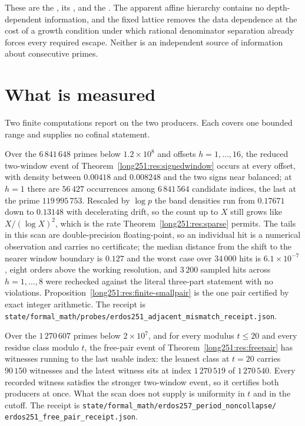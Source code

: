 \documentclass[11pt]{article}
\begin{document}
\noindent These are the
, its
, and the
.  The apparent affine hierarchy contains no depth-dependent
information, and the fixed lattice removes the data dependence at the cost of a
growth condition under which rational denominator separation already forces
every required escape.  Neither is an independent source of information about
consecutive primes.

\section{What is measured}\label{long251:sec:measurements}

Two finite computations report on the two producers.  Each covers one bounded
range and supplies no cofinal statement.

Over the $6\,841\,648$ primes below $1.2\times10^{8}$ and offsets
$h=1,\ldots,16$, the reduced two-window event of
Theorem~\ref{long251:res:signedwindow} occurs at every offset, with density between
$0.00418$ and $0.008248$ and the two signs near balanced; at $h=1$ there are
$56\,427$ occurrences among $6\,841\,564$ candidate indices, the last at the
prime $119\,995\,753$.  Rescaled by $\log p$ the band densities run from
$0.17671$ down to $0.13148$ with decelerating drift, so the count up to $X$
still grows like $X/(\log X)^2$, which is the rate
Theorem~\ref{long251:res:sparse} permits.  The tails in this scan are double-precision
floating-point, so an individual hit is a numerical observation and carries no
certificate; the median distance from the shift to the nearer window boundary
is $0.127$ and the worst case over $34\,000$ hits is $6.1\times10^{-7}$, eight
orders above the working resolution, and $3\,200$ sampled hits across
$h=1,\ldots,8$ were rechecked against the literal three-part statement with no
violations.  Proposition~\ref{long251:res:finite-smallpair} is the one pair certified
by exact integer arithmetic.  The receipt is
\texttt{state/formal\_math/probes/erdos251\_adjacent\_mismatch\_receipt.json}.

Over the $1\,270\,607$ primes below $2\times10^{7}$, and for every modulus
$t\le20$ and every residue class modulo $t$, the free-pair event of
Theorem~\ref{long251:res:freepair} has witnesses running to the last usable index: the
leanest class at $t=20$ carries $90\,150$ witnesses and the latest witness sits
at index $1\,270\,519$ of $1\,270\,540$.  Every recorded witness satisfies the
stronger two-window event, so it certifies both producers at once.  What the
scan does not supply is uniformity in $t$ and in the cutoff.  The receipt is
\texttt{state/formal\_math/erdos257\_period\_noncollapse/}\allowbreak
\texttt{erdos251\_free\_pair\_receipt.json}.
\end{document}
